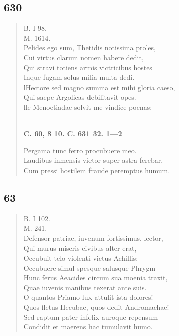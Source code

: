 \documentclass[11pt, a4paper]{report}
\begin{document}
            \subsection*{630}
      \begin{verse}
      B. I 98. \\ M. 1614. \\ Pelides ego sum, Thetidis notissima proles, \\ Cui virtus clarum nomen habere dedit, \\ Qui stravi totiens armis victricibus hostes \\ Inque fugam solus milia multa dedi. \\ lHectore sed magno summa est mihi gloria caeso, \\ Qui saepe Argolicas debilitavit opes. \\ lle Menoetiadae solvit me vindice poenas; \\ 
        ﻿\pagebreak 
     \marginpar{[98]} \begin{center} \textbf{C. 60, 8 10. C. 631 32. 1—2} \end{center}Pergama tunc ferro procubuere meo. \\ Laudibus inmensis victor super astra ferebar, \\ Cum pressi hostilem fraude peremptus humum. \\ 
      \end{verse}
  
            \subsection*{63}
      \begin{verse}
      B. I 102. \\ M. 241. \\ Defensor patriae, iuvenum fortissimus, lector, \\ Qui murus miseris civibus alter erat, \\ Occubuit telo violenti victus Achillis: \\ Occubuere simul spesque salusque Phrygm \\ Hunc ferus Aeacides circum sua moenia traxit, \\ Quae iuvenis manibus texerat ante suis. \\ O quantos Priamo lux attulit ista dolores! \\ Quos fletus Hecubae, quos dedit Andromachae! \\ Sed raptum pater infelix auroque repensum \\ Condidit et maerens hac tumulavit humo. \\ 
      \end{verse}
  
\end{document}
